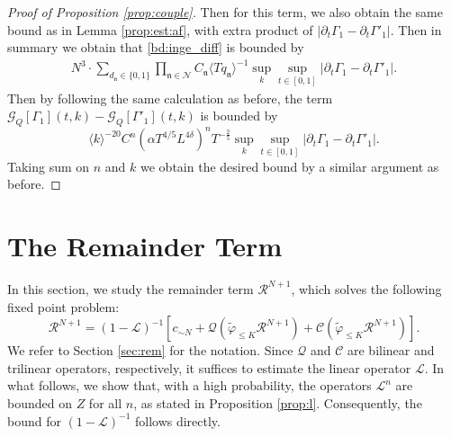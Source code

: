 \documentclass[UTF-8,reqno]{amsart}
\numberwithin{equation}{section}
\theoremstyle{definition}
\def\leq{\leqslant}
\def\leq{\leqslant}
\begin{document}
\begin{proof}[Proof of Proposition \ref{prop:couple}]
   Then for this term, we also obtain the same bound as in Lemma \ref{prop:est:af}, with extra  product of $|\partial_t\Gamma_1-\partial_t \Gamma'_1|$. 
   Then  in summary we obtain that \eqref{bd:inge_diff} is bounded by 
   \begin{align*}
       N^3\cdot\sum_{d_\mathfrak{n}\in\{0,1\}}\prod_{\mathfrak{n}\in\mathcal{N}}C_\mathfrak{n}\langle Tq_\mathfrak{n}\rangle^{-1} \sup_k\sup_{t\in[0,1]}|\partial_t\Gamma_1-\partial_t \Gamma'_1|.
   \end{align*}
   Then by following the same calculation as before, the term $   \mathcal{G}_Q[\Gamma_1](t,k)-    \mathcal{G}_Q[{\Gamma}'_1](t,k)$ is bounded by  $$ \langle k\rangle^{-20} C^{n}(\alpha  T^{4/5} L^{4\delta})^nT^{- \frac{2}{5}}\sup_k\sup_{t\in[0,1]}|\partial_t\Gamma_1-\partial_t \Gamma'_1|.$$
   Taking sum on $n$ and $k$ we obtain the desired bound by a similar argument as before.
 
\end{proof}


\section{The Remainder Term}\label{bd:remainder}
In this section, we study the remainder term $\mathcal{R}^{N+1}$, which solves the following fixed point problem:
\begin{equation}\mathcal{R}^{N+1}=(1-\mathscr{L})^{-1}[c_{\sim N}+\mathscr{Q}(\tilde\varphi_{\leq K}\mathcal{R}^{N+1})+\mathscr{C}(\tilde\varphi_{\leq K}\mathcal{R}^{N+1})].\label{def:rkn:fix}
\end{equation}
We refer to Section \ref{sec:rem} for the notation. Since $\mathscr{Q}$ and $\mathscr{C}$ are bilinear and trilinear operators, respectively, it suffices to estimate the linear operator $\mathscr{L}$.
In what follows, we show that, with a high probability, the operators $\mathscr{L}^n$ are bounded on $Z$ for all $n$, as stated in Proposition \ref{prop:l}. Consequently, the bound for $(1-\mathscr{L})^{-1}$ follows directly.
\end{document}

